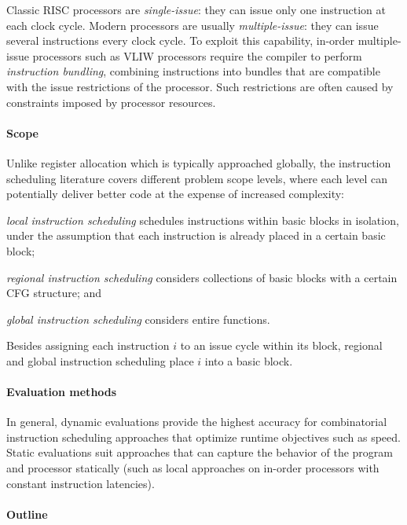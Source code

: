 \documentclass[acmsmall,authorversion,nonacm]{acmart}
\begin{document}
Classic RISC processors are \emph{single-issue}: they can issue only
one instruction at each clock cycle.
Modern processors are usually \emph{multiple-issue}: they can issue
several instructions every clock cycle.
To exploit this capability, in-order multiple-issue processors such as
VLIW processors require the compiler to perform \emph{instruction
  bundling}, combining instructions into bundles that are compatible
with the issue restrictions of the processor.
Such restrictions are often caused by constraints imposed by processor
resources.

\paragraph{Scope}

Unlike register allocation which is typically approached globally, the
instruction scheduling literature covers different problem scope
levels, where each level can potentially deliver better code at the
expense of increased complexity:
\begin{inparaitem}[]
\item \emph{local instruction scheduling} schedules instructions
  within basic blocks in isolation, under the assumption that each
  instruction is already placed in a certain basic block;
\item \emph{regional instruction scheduling} considers collections of
  basic blocks with a certain CFG structure; and
\item \emph{global instruction scheduling} considers entire functions.
\end{inparaitem}
Besides assigning each instruction $i$ to an issue cycle within its
block, regional and global instruction scheduling place $i$ into a
basic block.

\paragraph{Evaluation methods}

In general, dynamic evaluations provide the highest accuracy for
combinatorial instruction scheduling approaches that optimize runtime
objectives such as speed.
Static evaluations suit approaches that can capture the behavior of
the program and processor statically (such as local approaches on
in-order processors with constant instruction latencies).

\paragraph{Outline}
\end{document}
